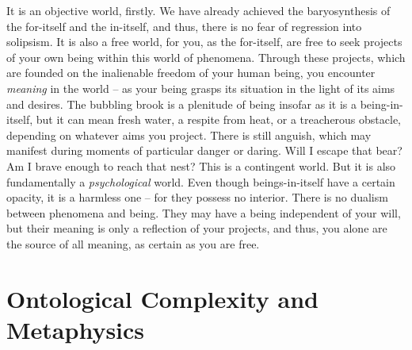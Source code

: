 It is an objective world, firstly. We have already achieved the baryosynthesis of the for-itself and the in-itself, and thus, there is no fear of regression into solipsism. It is also a free world, for you, as the for-itself, are free to seek projects of your own being within this world of phenomena. Through these projects, which are founded on the inalienable freedom of your human being, you encounter \emph{meaning} in the world -- as your being grasps its situation in the light of its aims and desires. The bubbling brook is a plenitude of being insofar as it is a being-in-itself, but it can mean fresh water, a respite from heat, or a treacherous obstacle, depending on whatever aims you project. There is still anguish, which may manifest during moments of particular danger or daring. Will I escape that bear? Am I brave enough to reach that nest? This is a contingent world. But it is also fundamentally a \emph{psychological} world. Even though beings-in-itself have a certain opacity, it is a harmless one -- for they possess no interior. There is no dualism between phenomena and being. They may have a being independent of your will, but their meaning is only a reflection of your projects, and thus, you alone are the source of all meaning, as certain as you are free.




\section{Ontological Complexity and Metaphysics}
 

